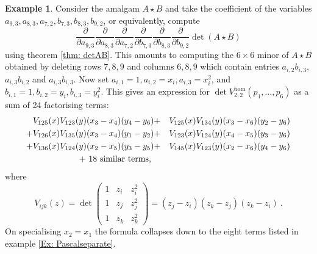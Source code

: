 \documentclass[10pt]{amsart}
\theoremstyle{definition}
\newtheorem{example}[thm]{Example}
\theoremstyle{remark}
\numberwithin{equation}{section}
\newcommand{\0}{\color{blue}{\mathsf{0}}}
\begin{document}
\begin{example} Consider the amalgam $A\star B$ and take the coefficient of the variables
$a_{9,3} ,a_{8,3}, a_{7,2}, b_{7,3} , b_{8,3} , b_{9,2}$, or equivalently, 
compute
\[  \frac{\partial}{\partial a_{9,3}} \frac{\partial}{\partial a_{8,3}}  \frac{\partial}{\partial a_{7,2}}  \frac{\partial}{\partial b_{7,3}}  \frac{\partial}{\partial b_{8,3}}  \frac{\partial}{\partial b_{9,2}}  \det(A\star B) \] 
using theorem \ref{thm: detAB}. 
This amounts to computing the  $6\times 6$ minor of $A \star B$ obtained by deleting rows $7,8,9$ and  columns $6,8,9$ which contain entries  $a_{i,2} b_{i,3}$, $a_{i,3} b_{i,2}$ and $a_{i,3} b_{i,3}$.  Now set $a_{i,1}=1, a_{i,2}=x_i, a_{i,3}=x_i^2$, and 
$b_{i,1}=1, b_{i,2}=y_i, b_{i,3}=y_i^2$. This gives an expression for 
$ \det V_{2,2}^{\mathrm{hom}} (p_1,\ldots, p_6) $
as a sum of 24 factorising terms:
\begin{eqnarray}   V_{125}(x)V_{123}(y) (x_3-x_4) (y_4-y_6) & +  &   V_{125}(x)V_{134}(y)(x_3-x_6)(y_2-y_6)   \nonumber \\
 + V_{126}(x)V_{135}(y)     (x_3-x_4)(y_1-y_2) & +  &   V_{123}(x)V_{124}(y)(x_4-x_5)(y_3-y_6)   \nonumber \\
+ V_{136}(x)V_{124}(y)     (x_2-x_5)(y_3-y_5) & +  &   V_{145}(x)V_{123}(y)(x_2-x_6)(y_4-y_6)   \nonumber \\
+   \hbox{  18 similar terms, } \nonumber 
\end{eqnarray} 
where  \[ V_{ijk}(z) = \det \begin{pmatrix} 1 & z_i & z_i^2 \\ 1 & z_j& z_j^2 \\ 1 & z_k & z_k^2 \end{pmatrix} = ( z_j-z_i )(z_k-z_j)(z_k-z_i) \ .\]
On specialising $x_2=x_1$ the formula collapses down to the eight terms listed in example \ref{Ex: Pascalseparate}.
\end{example}
\end{document}
